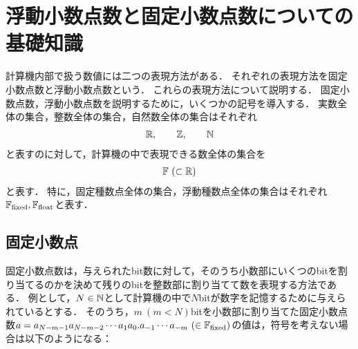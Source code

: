 \chapter{浮動小数点数と固定小数点数についての基礎知識}
\label{chap:基礎知識1}
計算機内部で扱う数値には二つの表現方法がある．
それぞれの表現方法を固定小数点数と浮動小数点数という．
これらの表現方法について説明する．
固定小数点数，浮動小数点数を説明するために，いくつかの記号を導入する．
実数全体の集合，整数全体の集合，自然数全体の集合はそれぞれ 
    \begin{align}    
        \mathbb{R},\hspace{2em} \mathbb{Z},\hspace{2em} \mathbb{N}
    \end{align}
と表すのに対して，計算機の中で表現できる数全体の集合を
\begin{align}
    \mathbb{F} \ (\subset \mathbb{R})  
\end{align}
と表す．
特に，固定種数点全体の集合，浮動種数点全体の集合はそれぞれ$\mathbb{F}_{\text{fixed}},\mathbb{F}_{\text{float}}$と表す．



\section{固定小数点}
固定小数点数は，与えられたbit数に対して，そのうち小数部にいくつのbitを割り当てるのかを決めて残りのbitを整数部に割り当てて数を表現する方法である．
例として，$N \in \mathbb{N}$として計算機の中で$N$bitが数字を記憶するために与えられているとする．
そのうち，$m \ (m < N)$bitを小数部に割り当てた固定小数点数$a = a_{N-m-1} a_{N-m-2} \cdots a_1 a_0. a_{-1} \cdots a_{-m} \ (\in \mathbb{F}_{\text{fixed}})$の値は，符号を考えない場合は以下のようになる：

